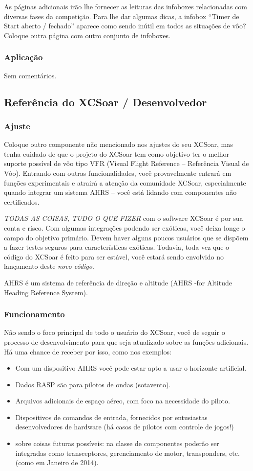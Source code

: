 As páginas adicionais irão lhe fornecer as leituras das infoboxes relacionadas com diversas fases da competição.  Para lhe dar algumas dicas, a infobox “Timer de Start aberto / fechado” aparece como sendo inútil em todos as situações de vôo?  Coloque outra página com outro conjunto de infoboxes.


\subsubsection*{Aplicação}
Sem comentários.

\subsection*{Referência do XCSoar / Desenvolvedor}
\subsubsection*{Ajuste} Coloque outro componente não mencionado nos ajustes do seu XCSoar, mas tenha cuidado de que o projeto do XCSoar tem como objetivo ter o melhor suporte possível de vôo tipo VFR (Visual Flight Reference – Referência Visual de Vôo).  Entrando com outras funcionalidades, você provavelmente entrará em funções experimentais e atrairá a atenção da comunidade XCSoar, especialmente quando integrar um sistema AHRS – você está lidando com componentes não certificados.   

\tip \emph{TODAS AS COISAS, TUDO O QUE FIZER} com o software XCSoar é por sua conta e risco.  Com algumas integrações podendo ser exóticas, você deixa longe o campo do objetivo primário.  Devem haver alguns poucos usuários que se dispõem a fazer testes seguros para características exóticas.  Todavia, toda vez que o código do XCSoar é feito para ser estável, você estará sendo envolvido no lançamento deste \emph{novo código}.

AHRS é um sistema de referência de direção e altitude (AHRS -for Altitude Heading Reference System).

\subsubsection*{Funcionamento} Não sendo o foco principal de todo o usuário do XCSoar, você de seguir o processo de desenvolvimento para que seja atualizado sobre as funções adicionais.  Há uma chance de receber por isso, como nos exemplos:
\begin{itemize}
\item Com um dispositivo AHRS você pode estar apto a usar o horizonte artificial.
\item Dados RASP são para pilotos de ondas (sotavento).
\item Arquivos adicionais de espaço aéreo, com foco na necessidade do piloto. 
\item Dispositivos de comandos de entrada, fornecidos por entusiastas desenvolvedores de hardware (há casos de pilotos com controle de jogos!)
\item sobre coisas futuras possíveis: na classe de componentes poderão ser integradas como transceptores, gerenciamento de motor, transponders, etc. (como em Janeiro de 2014).
\end{itemize}


